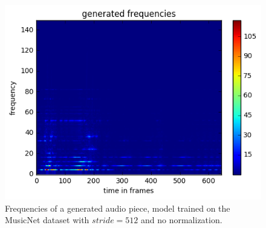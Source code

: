 \documentclass[10pt,conference,compsocconf]{IEEEtran}
\begin{document}
\begin{figure}[tbp]
  \centering
  \includegraphics[width=\columnwidth]{figures/generated_frequencies_20s_2.png}
  \caption{Frequencies of a generated audio piece, model trained on the MusicNet dataset with $stride=512$ and no normalization.}
  \label{fig:generated_frequencies}
\end{figure}

\end{document}
